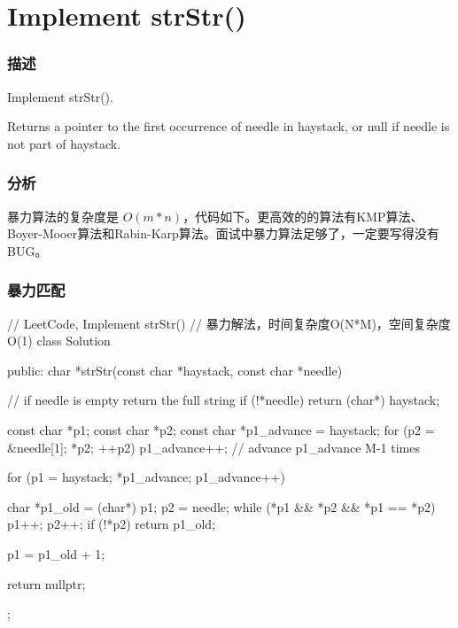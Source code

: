 \section{Implement strStr()} %
\label{sec:strstr}


\subsubsection{描述}
Implement strStr().

Returns a pointer to the first occurrence of needle in haystack, or null if needle is not part of haystack.


\subsubsection{分析}
暴力算法的复杂度是 $O(m*n)$，代码如下。更高效的的算法有KMP算法、Boyer-Mooer算法和Rabin-Karp算法。面试中暴力算法足够了，一定要写得没有BUG。


\subsubsection{暴力匹配}
\begin{Code}
// LeetCode, Implement strStr()
// 暴力解法，时间复杂度O(N*M)，空间复杂度O(1)
class Solution {
public:
    char *strStr(const char *haystack, const char *needle) {
        // if needle is empty return the full string
        if (!*needle) return (char*) haystack;

        const char *p1;
        const char *p2;
        const char *p1_advance = haystack;
        for (p2 = &needle[1]; *p2; ++p2) {
            p1_advance++;   // advance p1_advance M-1 times
        }

        for (p1 = haystack; *p1_advance; p1_advance++) {
            char *p1_old = (char*) p1;
            p2 = needle;
            while (*p1 && *p2 && *p1 == *p2) {
                p1++;
                p2++;
            }
            if (!*p2) return p1_old;

            p1 = p1_old + 1;
        }
        return nullptr;
    }
};
\end{Code}


